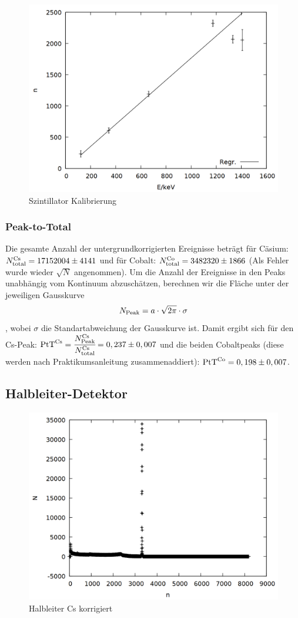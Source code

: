 \begin{figure}
\centering
\includegraphics[width=0.7\linewidth]{data/si_gauge.png}
\caption{Szintillator Kalibrierung}
\label{fig:si_gauge}
\end{figure}

\subsubsection*{Peak-to-Total}
Die gesamte Anzahl der untergrundkorrigierten Ereignisse beträgt für Cäsium: $N_\mathrm{total}^\mathrm{Cs} = 17152004 \pm 4141$ und für Cobalt: $N_\mathrm{total}^\mathrm{Co} = 3482320\pm 1866$ (Als Fehler wurde wieder $\sqrt{N}$ angenommen). 
Um die Anzahl der Ereignisse in den Peaks unabhängig vom Kontinuum abzuschätzen, berechnen wir die Fläche unter der jeweiligen Gausskurve \[N_\mathrm{Peak} = a\cdot\sqrt{2\pi}\cdot \sigma\], wobei $\sigma$ die Standartabweichung der Gausskurve ist.
Damit ergibt sich für den Cs-Peak: $\text{PtT}^\mathrm{Cs} = \cfrac{N_\mathrm{Peak}^\mathrm{Cs}}{N_\mathrm{total}^\mathrm{Cs}} = 0,237\pm 0,007$ und die beiden Cobaltpeaks (diese werden nach Praktikumsanleitung zusammenaddiert): $\text{PtT}^\mathrm{Co} = 0,198\pm 0,007$.

\subsection{Halbleiter-Detektor}
\begin{figure}
\centering
\includegraphics[width=0.7\linewidth]{data/ge_cs.png}
\caption{Halbleiter Cs korrigiert}
\label{fig:ge_cs}
\end{figure}

